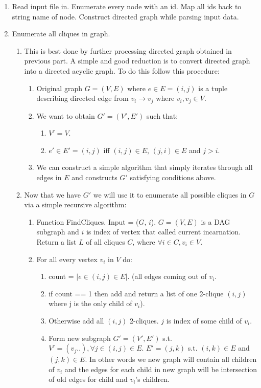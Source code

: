 \documentclass[11pt]{article}
\begin{document}
\begin{enumerate}
\item Read input file in.  Enumerate every node with an id.  Map all ids back to string name of node.  Construct directed graph while parsing input data.
\item Enumerate all cliques in graph.
\begin{enumerate}
\item This is best done by further processing directed graph obtained in previous part.  A simple and good reduction is to convert directed graph into a directed acyclic graph.  To do this follow this procedure:
\begin{enumerate}
\item Original graph $G = (V,E)$ where $e\in E = (i,j)$ is a tuple describing directed edge from $v_{i} \to v_{j}$ where $v_{i},v_{j}\in V$.
\item We want to obtain $G' = (V',E')$ such that:
\begin{enumerate}
\item $V'=V$.
\item $e'\in E' = (i,j)$ iff $(i,j)\in E$, $(j,i)\in E$ and $j > i$.
\end{enumerate}
\item We can construct a simple algorithm that simply iterates through all edges in $E$ and constructs $G'$ satisfying conditions above.
\end{enumerate}
\item Now that we have $G'$ we will use it to enumerate all possible cliques in $G$ via a simple recursive algorithm:
\begin{enumerate}
\item Function FindCliques.  Input = ($G$, $i$).  $G=(V,E)$ is a DAG subgraph and $i$ is index of vertex that called current incarnation.  Return a list $L$ of all cliques $C$, where $\forall i \in C, v_{i}\in V$.
\item For all every vertex $v_{i}$ in $V$ do:
\begin{enumerate}
\item count = $|e\in (i,j)\in E|$.  (all edges coming out of $v_{i}$.
\item if count == 1 then add and return a list of one 2-clique $(i,j)$ where j is the only child of $v_{i}$).
\item Otherwise add all $(i,j)$ 2-cliques.  $j$ is index of some child of $v_{i}$.
\item Form new subgraph $G'=(V',E')$ s.t. $V'=(v_{j}..), \forall j \in (i,j) \in E$.  $E'=(j,k)$ s.t. $(i,k) \in E$ and $(j,k) \in E$.  In other words we new graph will contain all children of $v_{i}$ and the edges for each child in new graph will be intersection of old edges for child and $v_{i}$'s children.  

\end{enumerate}
\end{enumerate}
\end{enumerate}
\end{enumerate}
\end{document}
